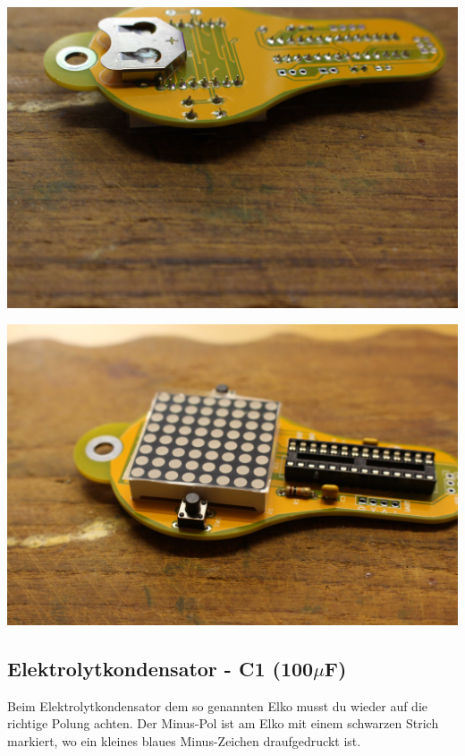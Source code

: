 \documentclass{article}
\begin{document}
\begin{minipage}[b]{0.5\textwidth}
	\includegraphics[width=\textwidth]{Bilder/IMG_5590.JPG}
	\label{fig:}
\end{minipage}
\begin{minipage}[b]{0.5\textwidth}
	\includegraphics[width=\textwidth]{Bilder/IMG_5592.JPG}
	\label{fig:}
\end{minipage}

\subsection{Elektrolytkondensator - C1 (100$\mu$F)}

Beim Elektrolytkondensator dem so genannten Elko musst du wieder auf die richtige Polung achten. Der Minus-Pol ist am Elko mit einem schwarzen Strich markiert, wo ein kleines blaues Minus-Zeichen draufgedruckt ist.
\end{document}
